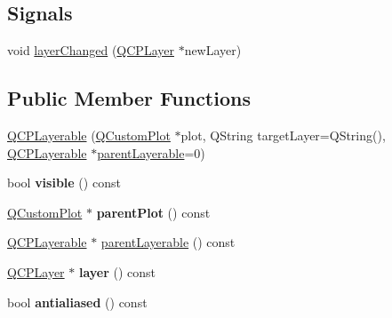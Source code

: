 \subsection*{Signals}
\begin{DoxyCompactItemize}
\item 
void \hyperlink{classQCPLayerable_abbf8657cedea73ac1c3499b521c90eba}{layer\+Changed} (\hyperlink{classQCPLayer}{Q\+C\+P\+Layer} $\ast$new\+Layer)
\end{DoxyCompactItemize}
\subsection*{Public Member Functions}
\begin{DoxyCompactItemize}
\item 
\hyperlink{classQCPLayerable_a74c0fa237f29bf0e49565013fc5d1ec0}{Q\+C\+P\+Layerable} (\hyperlink{classQCustomPlot}{Q\+Custom\+Plot} $\ast$plot, Q\+String target\+Layer=Q\+String(), \hyperlink{classQCPLayerable}{Q\+C\+P\+Layerable} $\ast$\hyperlink{classQCPLayerable_a98d79f5b716d45eac4347befe546d0ec}{parent\+Layerable}=0)
\item 
bool {\bfseries visible} () const \hypertarget{classQCPLayerable_a10a3cc92e0fa63e4a929e61d34e275a7}{}\label{classQCPLayerable_a10a3cc92e0fa63e4a929e61d34e275a7}

\item 
\hyperlink{classQCustomPlot}{Q\+Custom\+Plot} $\ast$ {\bfseries parent\+Plot} () const \hypertarget{classQCPLayerable_ab7e0e94461566093d36ffc0f5312b109}{}\label{classQCPLayerable_ab7e0e94461566093d36ffc0f5312b109}

\item 
\hyperlink{classQCPLayerable}{Q\+C\+P\+Layerable} $\ast$ \hyperlink{classQCPLayerable_a98d79f5b716d45eac4347befe546d0ec}{parent\+Layerable} () const 
\item 
\hyperlink{classQCPLayer}{Q\+C\+P\+Layer} $\ast$ {\bfseries layer} () const \hypertarget{classQCPLayerable_aea67e8c19145e70d68c286a36f6b8300}{}\label{classQCPLayerable_aea67e8c19145e70d68c286a36f6b8300}

\item 
bool {\bfseries antialiased} () const \hypertarget{classQCPLayerable_aef5cb4aa899ed9dc9384fd614560291e}{}\label{classQCPLayerable_aef5cb4aa899ed9dc9384fd614560291e}


\end{DoxyCompactItemize}
